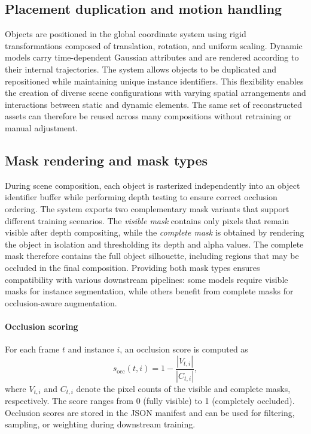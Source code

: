 \subsection{Placement duplication and motion handling}
Objects are positioned in the global coordinate system using rigid transformations composed of translation, rotation, and uniform scaling. Dynamic models carry time-dependent Gaussian attributes and are rendered according to their internal trajectories. The system allows objects to be duplicated and repositioned while maintaining unique instance identifiers. This flexibility enables the creation of diverse scene configurations with varying spatial arrangements and interactions between static and dynamic elements. The same set of reconstructed assets can therefore be reused across many compositions without retraining or manual adjustment.

\subsection{Mask rendering and mask types}
During scene composition, each object is rasterized independently into an object identifier buffer while performing depth testing to ensure correct occlusion ordering. The system exports two complementary mask variants that support different training scenarios. The \emph{visible mask} contains only pixels that remain visible after depth compositing, while the \emph{complete mask} is obtained by rendering the object in isolation and thresholding its depth and alpha values. The complete mask therefore contains the full object silhouette, including regions that may be occluded in the final composition. Providing both mask types ensures compatibility with various downstream pipelines: some models require visible masks for instance segmentation, while others benefit from complete masks for occlusion-aware augmentation.

\paragraph{Occlusion scoring}
For each frame \(t\) and instance \(i\), an occlusion score is computed as
\[
s_{\mathrm{occ}}(t,i) = 1 - \frac{|V_{t,i}|}{|C_{t,i}|},
\]
where \(V_{t,i}\) and \(C_{t,i}\) denote the pixel counts of the visible and complete masks, respectively. The score ranges from 0 (fully visible) to 1 (completely occluded). Occlusion scores are stored in the JSON manifest and can be used for filtering, sampling, or weighting during downstream training.

